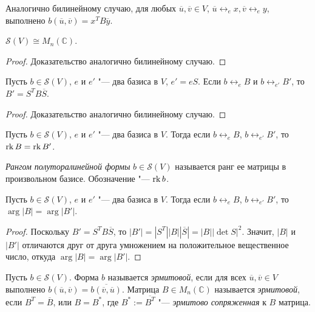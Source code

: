 \begin{note}
	Аналогично билинейному случаю, для любых $\overline{u}, \overline{v} \in V$, $\overline{u} \leftrightarrow_e x, \overline{v} \leftrightarrow_e y$, выполнено $b(\overline{u}, \overline{v}) = x^TB\overline{y}$.
\end{note}

\begin{proposition}
	$\mathcal{S}(V) \cong M_n(\mathbb{C})$.
\end{proposition}

\begin{proof}
	Доказательство аналогично билинейному случаю.
\end{proof}

\begin{theorem}
	Пусть $b \in \mathcal{S}(V)$, $e$ и $e'$ "--- два базиса в $V$, $e' = eS$. Если $b \leftrightarrow_e B$ и $b \leftrightarrow_{e'} B'$, то $B' = S^TB\overline{S}$.
\end{theorem}

\begin{proof}
	Доказательство аналогично билинейному случаю.
\end{proof}

\begin{corollary}
	Пусть $b \in \mathcal{S}(V)$, $e$ и $e'$ "--- два базиса в $V$. Тогда если $b \leftrightarrow_e B$, $b \leftrightarrow_{e'} B'$, то $\operatorname{rk}{B} = \operatorname{rk}{B'}$.
\end{corollary}

\begin{definition}
	\textit{Рангом полуторалинейной формы} $b \in \mathcal{S}(V)$ называется ранг ее матрицы в произвольном базисе. Обозначение "--- $\operatorname{rk}{b}$.
\end{definition}

\begin{corollary}
	Пусть $b \in \mathcal{S}(V)$, $e$ и $e'$ "--- два базиса в $V$. Тогда если $b \leftrightarrow_e B$, $b \leftrightarrow_{e'} B'$, то $\arg{|B|} = \arg{|B'|}$.
\end{corollary}

\begin{proof}
	Поскольку $B' = S^TB\overline{S}$, то $|B'| = |S^T||B||\overline{S}| = |B||\det{S}|^2$. Значит, $|B|$ и $|B'|$ отличаются друг от друга умножением на положительное вещественное число, откуда $\arg{|B|} = \arg{|B'|}$.
\end{proof}

\begin{definition}
	Пусть $b \in \mathcal{S}(V)$. Форма $b$ называется \textit{эрмитовой}, если для всех $\overline{u}, \overline{v} \in V$ выполнено $b(\overline{u}, \overline{v}) = \overline{b(\overline{v}, \overline{u})}$. Матрица $B \in M_n(\mathbb{C})$ называется \textit{эрмитовой}, если $B^T = \overline{B}$, или $B = B^*$, где $B^* := \overline{B^T}$ "--- \textit{эрмитово сопряженная} к $B$ матрица.
\end{definition}


